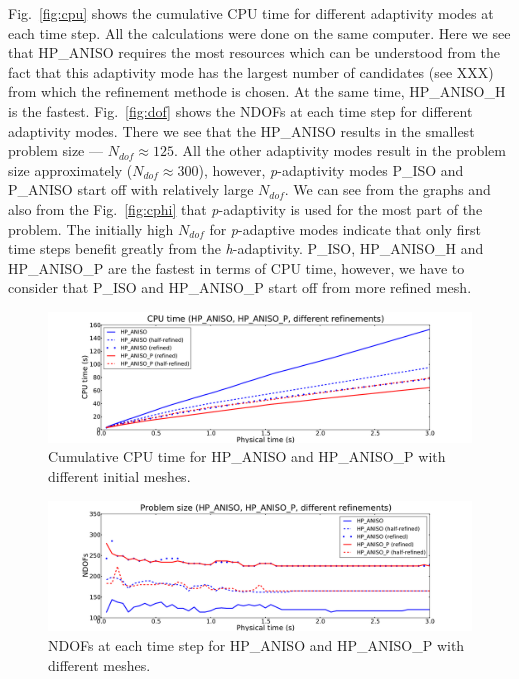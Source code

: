 Fig.~\ref{fig:cpu} shows the cumulative CPU time for different adaptivity
modes at each time step. All the calculations were done on the same computer.
Here we see that HP\_ANISO requires the most
resources which can be understood from the fact that this adaptivity mode has the largest number of 
candidates (see XXX) from which the refinement methode is chosen.
At the same time, HP\_ANISO\_H is the fastest.
Fig.~\ref{fig:dof} shows the NDOFs at each time step for different adaptivity modes.
There we see that the HP\_ANISO results in the smallest problem size --- $N_{dof} \approx 125$. 
All the other adaptivity modes result in  the problem size approximately ($N_{dof} \approx 300$), 
however, \emph{p}-adaptivity modes P\_ISO and P\_ANISO start off with relatively large $N_{dof}$.
We can see from the graphs and also from the Fig.~\ref{fig:cphi} that
\emph{p}-adaptivity is used for the most part of the problem. The initially high
$N_{dof}$ for \emph{p}-adaptive modes indicate that only first time steps benefit
greatly from the \emph{h}-adaptivity. P\_ISO, HP\_ANISO\_H
and HP\_ANISO\_P are the fastest in terms of CPU time, however, we have to consider
that P\_ISO  and HP\_ANISO\_P start off from more refined mesh.

\begin{figure}
  \begin{centering}
  \includegraphics[width=\columnwidth]{refined_cpu}
  \caption{\label{fig:refined-cpu} Cumulative CPU time for HP\_ANISO and HP\_ANISO\_P
  with different initial meshes.}
  \end{centering}
\end{figure}

\begin{figure}
  \begin{centering}
  \includegraphics[width=\columnwidth]{refined_dof}
  \caption{\label{fig:refined-dof} NDOFs at each time step for
  HP\_ANISO and HP\_ANISO\_P with different meshes.}
  \end{centering}
\end{figure}

